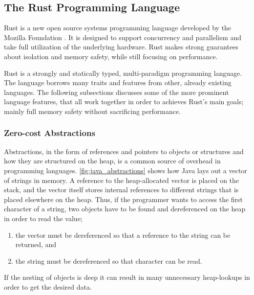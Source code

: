 
\subsection{The Rust Programming Language} %
\label{sub:the_rust_programming_language}

Rust \cite{web:rust_lang} is a new open source systems programming language developed by the Mozilla
Foundation \cite{web:mozilla_foundation}. It is designed to support concurrency and parallelism and
take full utilization of the underlying hardware. Rust makes strong guarantees about isolation and
memory safety, while still focusing on performance.

Rust is a strongly and statically typed, multi-paradigm programming language. The language borrows
many traits and features from other, already existing languages. The following subsections discusses
some of the more prominent language features, that all work together in order to achieves Rust's
main goals; mainly full memory safety without sacrificing performance.

\subsubsection{Zero-cost Abstractions}
\label{chap:zero_cost_abstractions}

Abstractions, in the form of references and pointers to objects or structures and how they are
structured on the heap, is a common source of overhead in programming languages.
\autoref{fig:java_abstractions}  shows how Java lays out a vector of
strings in memory. A reference to the heap-allocated vector is placed on the stack, and the vector
itself stores internal references to different strings that is placed elsewhere on the heap. Thus,
if the programmer wants to access the first character of a string, two objects have to be found and
dereferenced on the heap in order to read the value;

\begin{enumerate}
  \item the vector must be dereferenced so that a reference to the string can be returned, and
  \item the string must be dereferenced so that character can be read.
\end{enumerate}

If the nesting of objects is deep it can result in many unnecessary heap-lookups in order to get the
desired data.

